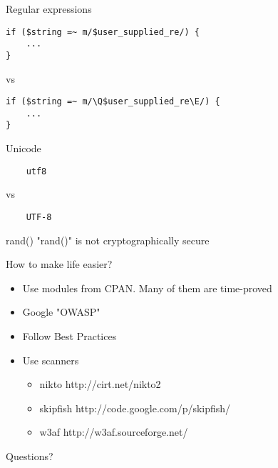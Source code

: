 \documentclass[14pt]{beamer}
\begin{document}
\begin{frame}[fragile]{Regular expressions}
    \begin{verbatim}
if ($string =~ m/$user_supplied_re/) {
    ...
}
    \end{verbatim}
    vs
    \begin{verbatim}
if ($string =~ m/\Q$user_supplied_re\E/) {
    ...
}
    \end{verbatim}
\end{frame}

\begin{frame}[fragile]{Unicode}
    \begin{verbatim}
    utf8
    \end{verbatim}
    vs
    \begin{verbatim}
    UTF-8
    \end{verbatim}
\end{frame}

\begin{frame}[fragile]{rand()}
    "rand()" is not cryptographically secure
\end{frame}

\begin{frame}
    How to make life easier?\pause
    \begin{itemize}
    \item Use modules from CPAN. Many of them are time-proved\pause
    \item Google "OWASP"\pause
    \item Follow Best Practices\pause
    \item Use scanners
    \begin{itemize}
        \item nikto http://cirt.net/nikto2
        \item skipfish http://code.google.com/p/skipfish/
        \item w3af http://w3af.sourceforge.net/
    \end{itemize}
    \end{itemize}
\end{frame}

\begin{frame}
    \begin{center}
    Questions?
    \end{center}
\end{frame}
\end{document}
